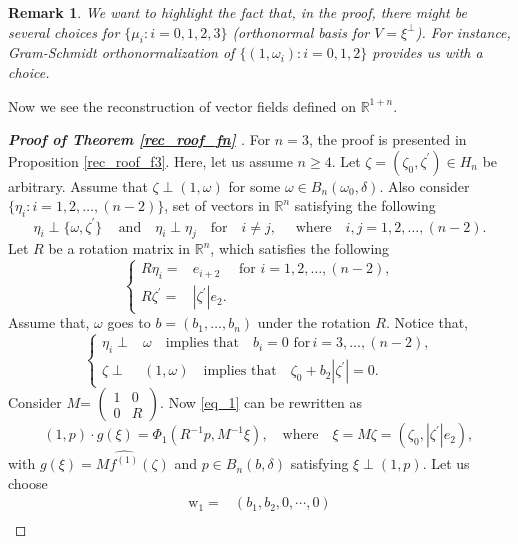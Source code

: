 \documentclass[11pt,a4paper,reqno]{amsart}
\newtheorem{remark}[definition]{Remark}
\newcommand{\R}{\mathbb{R}}
\newcommand{\om}{\omega}
\newcommand{\w}{\mathrm{w}}
\begin{document}
	\begin{remark}
		We want to highlight the fact that, in the proof, there might be several choices for $\{\mu_{i}:i=0,1,2,3\}$ (orthonormal basis for $V=\xi^{\perp}$). For instance, Gram-Schmidt orthonormalization of  $\{(1,\omega_i):i=0,1,2\}$ provides us with a choice. 
	\end{remark}
Now we see the reconstruction of vector fields defined on $\mathbb{R}^{1+n}$.
\begin{proof}[\textbf{Proof of Theorem \ref{rec_roof_fn}
}]
For $n=3$, the proof is presented in Proposition \ref{rec_roof_f3}. Here, let us assume $n\geq 4$.
Let $\zeta  =(\zeta_0,\zeta^{'}) \in H_n $ be arbitrary. Assume that $\zeta \perp (1,\omega)$ for some  $\omega \in  B_{n}(\omega_0,\delta)$. Also consider $\{\eta_{i}:i=1,2,\dots, (n-2)\}$, set of vectors in $\R^{n}$ satisfying the following
		\[
		\eta_{i}\perp \{\om, \zeta^{'} \}\, \quad \text{and} \quad \eta_i\perp \eta_j \quad \text{for}\quad i\neq j, \quad \text{ where}\quad  i,j=1,2,\dots ,(n-2). 
		\]
		Let $R$ be a rotation matrix in $\mathbb{R}^{n}$, which satisfies the following
		\[
		\left\{\begin{aligned}
			R\eta_i=&e_{i+2}\quad \text{ for }i=1,2,\dots, (n-2),\\
			R\zeta^{'}=&|\zeta^{'}|e_{2}.
		\end{aligned}
		\right.
		\]
		Assume that, $\omega$ goes to $b=(b_1,\dots,b_n)$ under the rotation $R$. Notice that,
		\[\left\{
		\begin{aligned}
			\eta_i\perp &\omega \quad \text{implies that}\quad b_i=0 \text{ for} \, i=3,\dots,(n-2),\\
			\zeta\perp &(1,\omega) \quad \text{implies that}\quad \zeta_0+b_2|\zeta^{'}|=0.
		\end{aligned}
		\right.
		\]
		Consider $M$= 
		$\begin{pmatrix}
			1&0\\
			0&R
		\end{pmatrix}$. Now \eqref{eq_1} can be rewritten as
		\begin{equation}\label{reinv1}
			(1,p)\cdot g(\xi)=\Phi_1(R^{-1}p,M^{-1}\xi),\quad \text{where}\quad \xi=M\zeta=(\zeta_{0},|\zeta^{'}|e_2),\, 
		\end{equation}
		with $g(\xi)=M\widehat{f^{(1)}}(\zeta)$ and $p\in B_n(b,\delta)$ satisfying $\xi \perp (1,p)$. Let us choose 
\begin{equation}\label{phi_i}
\begin{aligned}
\w_{1}=&(b_1,b_2,0,\cdots,0)\\

\end{aligned}
\end{equation}
\end{proof}
\end{document}
